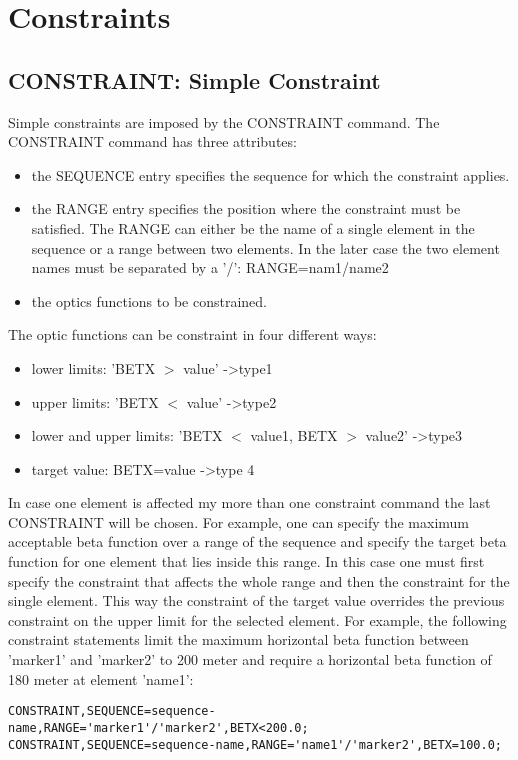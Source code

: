  
\section{Constraints}

\subsection{CONSTRAINT: Simple Constraint}
\label{subsec:match_con}

Simple constraints are imposed by the CONSTRAINT command. The CONSTRAINT
command has three attributes:   
\begin{itemize}
	\item  the SEQUENCE entry specifies the sequence for which the
          constraint applies.  
	\item  the RANGE entry specifies the position where the
          constraint must be satisfied. The RANGE can either be the name
          of a single element in the sequence or a range between two
          elements. In the later case the two element names must be
          separated by a '/': RANGE=nam1/name2  
	\item the optics functions to be constrained. 
\end{itemize} 

The optic functions can be constraint in four different ways: 
\begin{itemize}
	\item lower limits: 'BETX $>$ value' -\textgreater type1 
	\item upper limits: 'BETX $<$ value' -\textgreater type2 
	\item lower and upper limits: 'BETX $<$ value1, 
          BETX $>$ value2' -\textgreater type3  
	\item target value: BETX=value -\textgreater type 4 
\end{itemize} 

In case one element is affected my more than one constraint command the
last  CONSTRAINT will be chosen. For example, one can specify the
maximum acceptable beta function over a range of the sequence and
specify the target beta  function for one element that lies inside this
range. In this case one must first specify the constraint that affects
the whole range and then the constraint for the single element. This way
the constraint of the target value overrides the previous constraint on
the upper limit for the selected element. For example, the following
constraint statements limit the maximum horizontal beta function between
'marker1' and 'marker2' to 200 meter and require a horizontal beta
function of 180 meter at element 'name1':  
\begin{verbatim}
CONSTRAINT,SEQUENCE=sequence-name,RANGE='marker1'/'marker2',BETX<200.0;
CONSTRAINT,SEQUENCE=sequence-name,RANGE='name1'/'marker2',BETX=100.0;
\end{verbatim}

